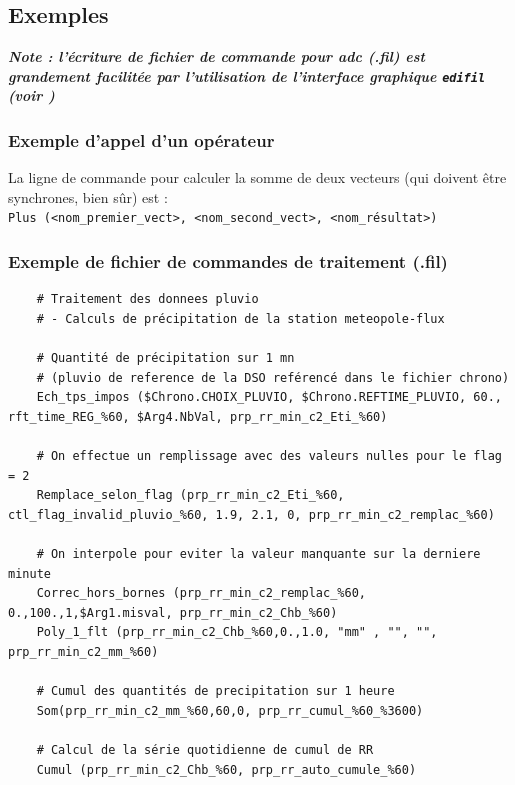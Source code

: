 \subsection{Exemples}

\textbf{\textit{Note : l'écriture de fichier de commande pour adc (.fil) est
grandement facilitée par l'utilisation de l'interface graphique \texttt{edifil}
(voir )}}

\subsubsection{Exemple d'appel d'un opérateur}

La ligne de commande pour calculer la somme de deux vecteurs (qui doivent
être synchrones, bien sûr) est : \\
\texttt{Plus (<nom\_premier\_vect>, <nom\_second\_vect>, <nom\_résultat>)}

\subsubsection{Exemple de fichier de commandes de traitement (.fil)}
\begin{landscape}
\thispagestyle{mylandscape} %
  \begin{lstlisting}
    # Traitement des donnees pluvio
    # - Calculs de précipitation de la station meteopole-flux
    
    # Quantité de précipitation sur 1 mn
    # (pluvio de reference de la DSO reférencé dans le fichier chrono)
    Ech_tps_impos ($Chrono.CHOIX_PLUVIO, $Chrono.REFTIME_PLUVIO, 60., rft_time_REG_%60, $Arg4.NbVal, prp_rr_min_c2_Eti_%60) 
    
    # On effectue un remplissage avec des valeurs nulles pour le flag = 2
    Remplace_selon_flag (prp_rr_min_c2_Eti_%60, ctl_flag_invalid_pluvio_%60, 1.9, 2.1, 0, prp_rr_min_c2_remplac_%60)
    
    # On interpole pour eviter la valeur manquante sur la derniere minute
    Correc_hors_bornes (prp_rr_min_c2_remplac_%60, 0.,100.,1,$Arg1.misval, prp_rr_min_c2_Chb_%60)
    Poly_1_flt (prp_rr_min_c2_Chb_%60,0.,1.0, "mm" , "", "", prp_rr_min_c2_mm_%60) 
    
    # Cumul des quantités de precipitation sur 1 heure
    Som(prp_rr_min_c2_mm_%60,60,0, prp_rr_cumul_%60_%3600)
    
    # Calcul de la série quotidienne de cumul de RR
    Cumul (prp_rr_min_c2_Chb_%60, prp_rr_auto_cumule_%60)
  \end{lstlisting}
\end{landscape}
\restoregeometry


